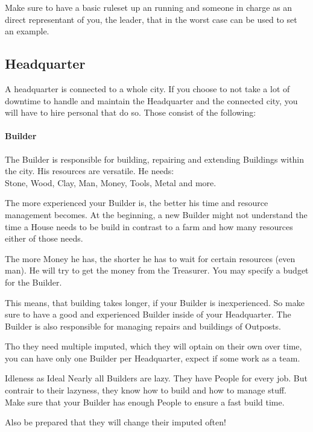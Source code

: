 \documentclass[10pt,twoside,twocolumn,openany]{book}
\begin{document}
Make sure to have a basic ruleset up an running and someone in charge as an direct representant of you, the leader, that in the worst case can be used to set an example.

\subsection{Headquarter}

A headquarter is connected to a whole city. If you choose to not take a lot of downtime to handle and maintain the Headquarter and the connected city, you will have to hire personal that do so. Those consist of the following:

\newpage

\paragraph{Builder}

The Builder is responsible for building, repairing and extending Buildings within the city. His resources are versatile. He needs:\\
Stone, Wood, Clay, Man, Money, Tools, Metal and more.

The more experienced your Builder is, the better his time and resource management becomes. At the beginning, a new Builder might not understand the time a House needs to be build in contrast to a farm and how many resources either of those needs.

The more Money he has, the shorter he has to wait for certain resources (even man). He will try to get the money from the Treasurer. You may specify a budget for the Builder.

This means, that building takes longer, if your Builder is inexperienced. So make sure to have a good and experienced Builder inside of your Headquarter. The Builder is also responsible for managing repairs and buildings of Outposts.

Tho they need multiple imputed, which they will optain on their own over time, you can have only one Builder per Headquarter, expect if some work as a team.

\begin{paperbox}{Idleness as Ideal}
Nearly all Builders are lazy. They have People for every job. But contrair to their lazyness, they know how to build and how to manage stuff. Make sure that your Builder has enough People to ensure a fast build time.

Also be prepared that they will change their imputed often!
\end{paperbox}
\end{document}
